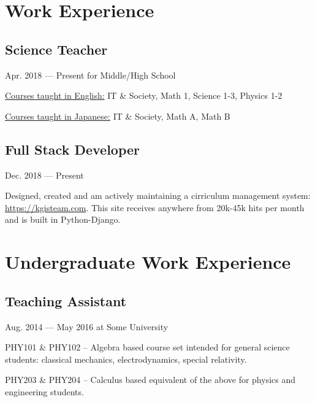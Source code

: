 \documentclass[letterpaper]{easyCV}
\begin{document}
\begin{main}[10pt]
\section{Work Experience}

\subsection{Science Teacher}{Apr. 2018 --- Present 
for Middle/High School}
    \begin{mainlist}
    \item \underline{Courses taught in English:} 
        IT \& Society, Math 1, Science 1-3, Physics 1-2
    \item \underline{Courses taught in Japanese:} 
        IT \& Society, Math A, Math B
    \end{mainlist}

\subsection{Full Stack Developer}
{Dec. 2018 --- Present}
    \begin{mainlist}
    \item Designed, created and am actively maintaining
        a cirriculum management system: 
        \href{https://kgisteam.com}
        {https://kgisteam.com}. This site receives
        anywhere from 20k-45k hits per month and is
        built in Python-Django.
    \end{mainlist}

\section{Undergraduate Work Experience}

\subsection{Teaching Assistant}{Aug. 2014 --- May 2016
at Some University}
    \begin{mainlist}
        \item PHY101 \& PHY102 -- Algebra based course
            set intended for general science students:
            classical mechanics, electrodynamics, 
            special relativity.

        \item PHY203 \& PHY204 -- Calculus based 
            equivalent of the above for physics 
            and engineering students.
    \end{mainlist}


\end{main}
\end{document}
